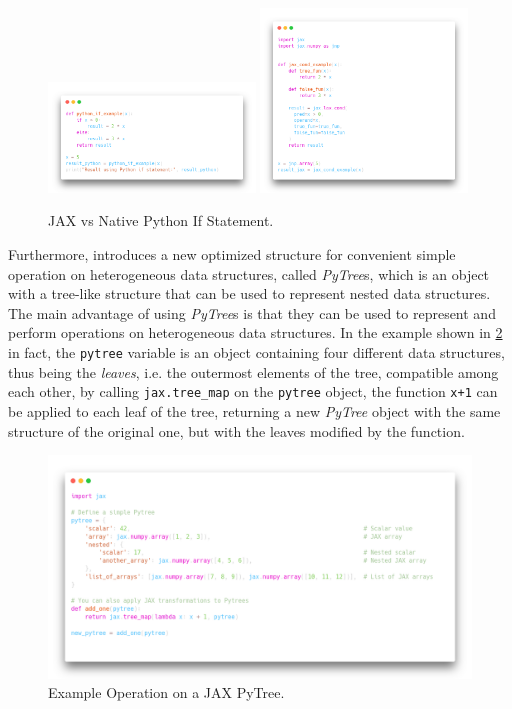 \begin{figure}
    \centering
    \caption{JAX vs Native Python If Statement.}
    \label{fig:jax_python_if}
    \includegraphics[width=0.49\textwidth]{Images/python_if.png}
    \includegraphics[width=0.49\textwidth]{Images/jax_if.png}
\end{figure}

Furthermore, \jax introduces a new optimized structure for convenient simple operation on heterogeneous data structures, called \textit{PyTree}s, which is an object with a tree-like structure that can be used to represent nested data structures. The main advantage of using \textit{PyTree}s is that they can be used to represent and perform operations on heterogeneous data structures. In the example shown in \cref{fig:pytree_example} in fact, the \texttt{pytree} variable is an object containing four different data structures, thus being the \textit{leaves}, i.e. the outermost elements of the tree, compatible among each other, by calling \texttt{jax.tree\_map} on the \texttt{pytree} object, the function \texttt{x+1} can be applied to each leaf of the tree, returning a new \textit{PyTree} object with the same structure of the original one, but with the leaves modified by the function.

\begin{figure}
    \centering
    \caption{Example Operation on a JAX PyTree.}
    \label{fig:pytree_example}
    \includegraphics[width=\textwidth]{Images/pytree_example.png}
\end{figure}

